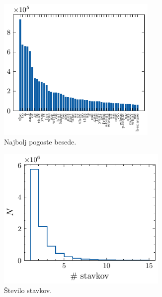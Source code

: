\documentclass[11pt, oneside]{article}
\theoremstyle{definition}
\begin{document}
\begin{figure}[h!]
    \centering
    \begin{subfigure}[b]{0.49\textwidth}
        \centering
        \includegraphics[width=0.84\textwidth]{word_count.pdf}
        \caption{Najbolj pogoste besede.}
        \label{fig: w1}
    \end{subfigure}
    \hfill
    \begin{subfigure}[b]{0.49\textwidth}
        \centering
        \includegraphics[width=0.9\textwidth]{sent_count.pdf}
        \caption{Število stavkov.}
        \label{fig: w2}
    \end{subfigure}
    \hfill
    \begin{subfigure}[b]{0.49\textwidth}

\end{subfigure}
\end{figure}
\end{document}
